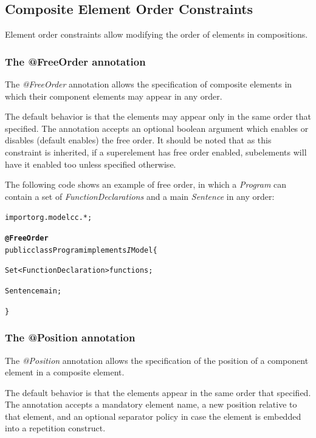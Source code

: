 \documentclass[a4paper,twoside,onecolumn]{article}
\newenvironment{colframe}{%
  \begin{Sbox} 
    \begin{minipage}{.8\columnwidth} 
}{%

  \end{minipage} 
  \end{Sbox} 
  \begin{center} 
    \fcolorbox{black}{MyGray}{\TheSbox} 
  \end{center} 
}
\newcommand{\an}[1]{\emph{#1}} %
\begin{document}
\subsection{Composite Element Order Constraints}

Element order constraints allow modifying the order of elements in compositions.

\subsubsection{The @FreeOrder annotation}

The \an{@FreeOrder} annotation allows the specification of composite elements in which their component elements may appear in any order.

The default behavior is that the elements may appear only in the same order that specified. The annotation accepts an optional boolean argument which enables or disables (default enables) the free order. It should be noted that as this constraint is inherited, if a superelement has free order enabled, subelements will have it enabled too unless specified otherwise.

The following code shows an example of free order, in which a \emph{Program} can contain a set of \emph{FunctionDeclarations} and a main \emph{Sentence} in any order:

\begin{colframe}
\begin{alltt}
import org.modelcc.*;

{\bf @FreeOrder}
public class Program implements{\emph IModel} \{

  Set<FunctionDeclaration> functions;

  Sentence main;

\}
\end{alltt}
\end{colframe}

\subsubsection{The @Position annotation}

The \an{@Position} annotation allows the specification of the position of a component element in a composite element.

The default behavior is that the elements appear in the same order that specified. The annotation accepts a mandatory element name, a new position relative to that element, and an optional separator policy in case the element is embedded into a repetition construct.
\end{document}
